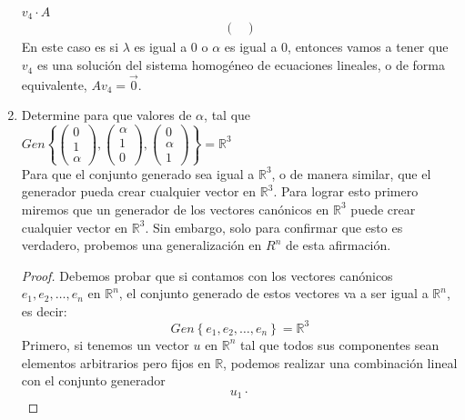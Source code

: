 \documentclass{article}
\begin{document}
\begin{enumerate}
\begin{mathcase}{\(v_4 \cdot A\)}
\[\begin{aligned}
\begin{pmatrix}
                    \end{pmatrix}
                \end{aligned}
            \]
            En este caso es si \(\lambda\) es igual a 0 o \(\alpha\) es igual a 0, entonces 
            vamos a tener que \(v_4\) es una solución del sistema homogéneo de ecuaciones lineales,
            o de forma equivalente, \(Av_4 = \vec{0}\).
        \end{mathcase}
    \setcounter{enumi}{12}
    \item Determine para que valores de \(\alpha\), tal que
        \(
            Gen \left\{
                \begin{pmatrix}
                    0 \\ 1 \\ \alpha
                \end{pmatrix},
                \begin{pmatrix}
                    \alpha \\ 1 \\ 0
                \end{pmatrix},
                \begin{pmatrix}
                    0 \\ \alpha \\ 1
                \end{pmatrix}
            \right\}
            = \mathbb{R}^3
        \) \\
        Para que el conjunto generado sea igual a \(\mathbb{R}^3\), o de manera similar, que el generador pueda crear cualquier vector en \(\mathbb{R}^3\). 
        Para lograr esto primero miremos que un generador de los vectores canónicos en \(\mathbb{R}^3\) puede crear cualquier vector en \(\mathbb{R}^3\).
        Sin embargo, solo para confirmar que esto es verdadero, probemos una generalización en \(R^n\) de esta afirmación.
        \begin{proof}
            Debemos probar que si contamos con los vectores canónicos \(e_1, e_2, \ldots, e_n\) en \(\mathbb{R}^n\), el conjunto generado de estos vectores va a ser igual a \(\mathbb{R}^n\),
            es decir:
            \[
                Gen\left\{e_1, e_2, \ldots, e_n\right\} = \mathbb{R}^3
            \]
            Primero, si tenemos un vector \(u\) en \(\mathbb{R}^n\) tal que todos sus componentes sean elementos arbitrarios pero fijos en \(\mathbb{R}\),
            podemos realizar una combinación lineal con el conjunto generador
            \[
                u_1 
                \cdot 
\]
\end{proof}
\end{enumerate}
\end{document}

